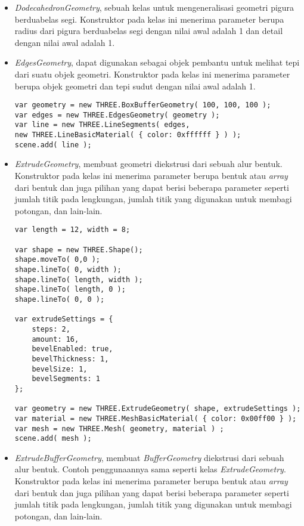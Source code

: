 \begin{itemize}
\begin{itemize}
	\item {\it DodecahedronGeometry}, sebuah kelas untuk mengeneralisasi geometri pigura berduabelas segi. Konstruktor pada kelas ini menerima parameter berupa radius dari pigura berduabelas segi dengan nilai awal adalah 1 dan detail dengan nilai awal adalah 1.

	\item {\it EdgesGeometry}, dapat digunakan sebagai objek pembantu untuk melihat tepi dari suatu objek geometri. Konstruktor pada kelas ini menerima parameter berupa objek geometri dan tepi sudut dengan nilai awal adalah 1.
	
\begin{lstlisting}[caption={Contoh penggunaan kelas {\it EdgesGeometry}.},captionpos=b]
var geometry = new THREE.BoxBufferGeometry( 100, 100, 100 );
var edges = new THREE.EdgesGeometry( geometry );
var line = new THREE.LineSegments( edges,
new THREE.LineBasicMaterial( { color: 0xffffff } ) );
scene.add( line );
\end{lstlisting}

	\item {\it ExtrudeGeometry}, membuat geometri diekstrusi dari sebuah alur bentuk. Konstruktor pada kelas ini menerima parameter berupa bentuk atau {\it array} dari bentuk dan juga pilihan yang dapat berisi beberapa parameter seperti jumlah titik pada lengkungan, jumlah titik yang digunakan untuk membagi potongan, dan lain-lain.
	
\begin{lstlisting}[caption={Contoh penggunaan kelas {\it ExtrudeGeometry}.},captionpos=b]
var length = 12, width = 8;

var shape = new THREE.Shape();
shape.moveTo( 0,0 );
shape.lineTo( 0, width );
shape.lineTo( length, width );
shape.lineTo( length, 0 );
shape.lineTo( 0, 0 );

var extrudeSettings = {
	steps: 2,
	amount: 16,
	bevelEnabled: true,
	bevelThickness: 1,
	bevelSize: 1,
	bevelSegments: 1
};

var geometry = new THREE.ExtrudeGeometry( shape, extrudeSettings );
var material = new THREE.MeshBasicMaterial( { color: 0x00ff00 } );
var mesh = new THREE.Mesh( geometry, material ) ;
scene.add( mesh );
\end{lstlisting}

	\item {\it ExtrudeBufferGeometry}, membuat {\it BufferGeometry} diekstrusi dari sebuah alur bentuk. Contoh penggunaannya sama seperti kelas {\it ExtrudeGeometry}. Konstruktor pada kelas ini menerima parameter berupa bentuk atau {\it array} dari bentuk dan juga pilihan yang dapat berisi beberapa parameter seperti jumlah titik pada lengkungan, jumlah titik yang digunakan untuk membagi potongan, dan lain-lain.


\end{itemize}
\end{itemize}

